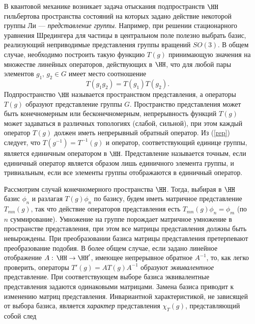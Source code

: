 \documentclass[a4paper
]{article}
\begin{document}
В квантовой механике возникает задача отыскания подпространств
$\HH$ гильбертова пространства состояний на которых задано
действие некоторой группы Ли --- {\em представление группы}.
Например, при решении стационарного уравнения Шредингера для
частицы в центральном поле  полезно выбрать базис, реализующий
неприводимые представления группы вращений $SO(3)$. В общем
случае, необходимо построить такую функцию $T(g)$ принимающую
значения на множестве линейных операторов, действующих в $\HH$,
что для любой пары элементов $g_1,\,g_2 \in G$ имеет место
соотношение
\begin{equation}\label{rep}
   T(g_1g_2)=T(g_1)T(g_2).
\end{equation}  Подпространство $\HH$ называется
пространством представления, а операторы $T(g)$ образуют
представление группы $G$. Пространство представления может быть
конечномерным или бесконечномерным, непрерывность функций $T(g)$
может  задаваться  в различных топологиях (слабой, сильной), при
этом каждый оператор $T(g)$ должен иметь непрерывный обратный
оператор. Из (\ref{rep}) следует, что $T(g^{-1})=T^{-1}(g)$ и
оператор, соответствующий единице группы, является  единичным
оператором в $\HH$. Представление называется точным, если
единичный оператор является образом лишь единичного элемента
группы, и тривиальным, если все элементы группы отображаются в
единичный оператор.
\par
Рассмотрим случай конечномерного пространства $\HH$. Тогда,
выбирая в $\HH$ базис $\phi_n$ и разлагая $T(g) \phi_n$ по базису,
будем иметь матричное представление $T_{mn}(g)$, так что действие
операторов представления есть $T_{mn}(g) \phi_n=\phi_m$ (по $n$
суммирование). Умножение на группе порождает матричное умножение в
пространстве представления, при этом все матрицы представления
должны быть невырождены. При преобразовании базиса матрицы
представления претерпевают преобразование подобия. В более общем
случае, если задано линейное отображение $A:\,\HH\to \HH'$,
имеющее непрерывное обратное $A^{-1}$, то, как легко проверить,
операторы $T'(g)=AT(g)A^{-1}$ образуют {\em эквивалентное}
представление. При соответствующем выборе базиса эквивалентные
представления задаются одинаковыми матрицами.   Замена базиса
приводит к изменению матриц представления. Инвариантной
характеристикой, не зависящей от выбора базиса, является {\em
характер} представления $\chi_T(g)$, представляющий собой след
\end{document}
